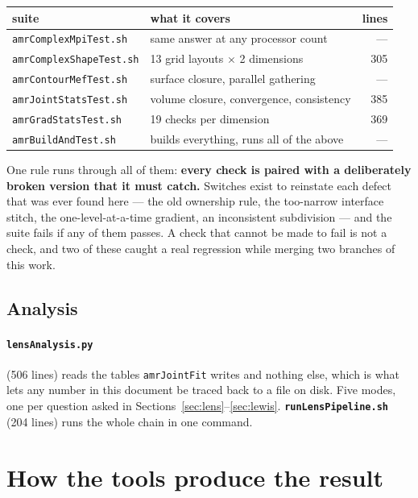 \documentclass[11pt]{article}
\begin{document}
\begin{center}
\begin{tabular}{llr}
\toprule
suite & what it covers & lines \\
\midrule
\texttt{amrComplexMpiTest.sh}   & same answer at any processor count & --- \\
\texttt{amrComplexShapeTest.sh} & 13 grid layouts $\times$ 2 dimensions & 305 \\
\texttt{amrContourMefTest.sh}   & surface closure, parallel gathering & --- \\
\texttt{amrJointStatsTest.sh}   & volume closure, convergence, consistency & 385 \\
\texttt{amrGradStatsTest.sh}    & 19 checks per dimension & 369 \\
\texttt{amrBuildAndTest.sh}     & builds everything, runs all of the above & --- \\
\bottomrule
\end{tabular}
\end{center}

One rule runs through all of them: \textbf{every check is paired with a
deliberately broken version that it must catch.} Switches exist to reinstate
each defect that was ever found here --- the old ownership rule, the
too-narrow interface stitch, the one-level-at-a-time gradient, an inconsistent
subdivision --- and the suite fails if any of them passes. A check that cannot
be made to fail is not a check, and two of these caught a real regression while
merging two branches of this work.

\subsection{Analysis}

\paragraph{\texttt{lensAnalysis.py}} (506 lines) reads the tables
\texttt{amrJointFit} writes and nothing else, which is what lets any number in
this document be traced back to a file on disk. Five modes, one per question
asked in Sections~\ref{sec:lens}--\ref{sec:lewis}. \textbf{\texttt{runLensPipeline.sh}}
(204 lines) runs the whole chain in one command.

\section{How the tools produce the result}
\label{sec:chain}
\end{document}
